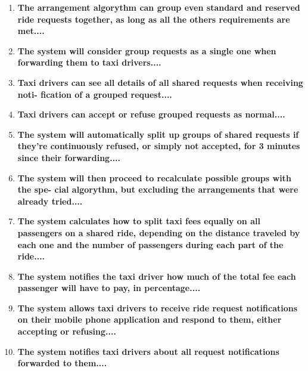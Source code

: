 \begin{enumerate}
	\item \textbf{The arrangement algorythm can group even standard and reserved ride
		requests together, as long as all the others requirements are met....}\\
	
	\item \textbf{The system will consider group requests as a single one when forwarding
		them to taxi drivers....}\\
	
	\item \textbf{Taxi drivers can see all details of all shared requests when receiving noti-
		fication of a grouped request....}\\
	
	\item \textbf{Taxi drivers can accept or refuse grouped requests as normal....}\\
	
	\item \textbf{The system will automatically split up groups of shared requests if they're
		continuously refused, or simply not accepted, for 3 minutes since their
		forwarding....}\\
	
	\item \textbf{The system will then proceed to recalculate possible groups with the spe-
		cial algorythm, but excluding the arrangements that were already tried....}\\
	
	\item \textbf{The system calculates how to split taxi fees equally on all passengers on
		a shared ride, depending on the distance traveled by each one and the
		number of passengers during each part of the ride....}\\
	
	\item \textbf{The system notifies the taxi driver how much of the total fee each passenger
		will have to pay, in percentage....}\\
	
	\item \textbf{The system allows taxi drivers to receive ride request notifications on
		their mobile phone application and respond to them, either accepting or
		refusing....}\\
	
	\item \textbf{The system notifies taxi drivers about all request notifications forwarded
		to them....}\\
	

\end{enumerate}
